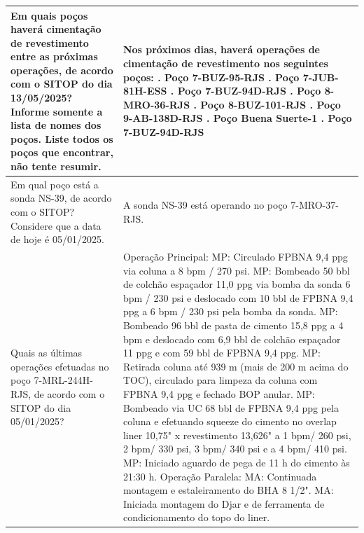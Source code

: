 \begin{landscape}
\begin{longtable}{|p{3cm}|p{22cm}|}
Em quais poços haverá cimentação de revestimento entre as próximas operações, de acordo com o SITOP do dia 13/05/2025? Informe somente a lista de nomes dos poços. Liste todos os poços que encontrar, não tente resumir. & Nos próximos dias, haverá operações de cimentação de revestimento nos seguintes poços:
        \newline        1. Poço 7-BUZ-95-RJS
        \newline        2. Poço 7-JUB-81H-ESS
        \newline        3. Poço 7-BUZ-94D-RJS
        \newline        4. Poço 8-MRO-36-RJS
        \newline        5. Poço 8-BUZ-101-RJS
        \newline        6. Poço 9-AB-138D-RJS
        \newline        7. Poço Buena Suerte-1
        \newline        8. Poço 7-BUZ-94D-RJS \\ \hline

Em qual poço está a sonda NS-39, de acordo com o SITOP? Considere que a data de hoje é 05/01/2025.  & A sonda NS-39 está operando no poço 7-MRO-37-RJS. \\ \hline

Quais as últimas operações efetuadas no poço 7-MRL-244H-RJS, de acordo com o SITOP do dia 05/01/2025? & Operação Principal:
        MP: Circulado FPBNA 9,4 ppg via coluna a 8 bpm / 270 psi.
        MP: Bombeado 50 bbl de colchão espaçador 11,0 ppg via bomba da sonda 6 bpm / 230 psi e deslocado com 10 bbl de FPBNA 9,4 ppg a 6 bpm / 230 psi pela bomba da sonda.
        MP: Bombeado 96 bbl de pasta de cimento 15,8 ppg a 4 bpm e deslocado com 6,9 bbl de colchão espaçador 11 ppg e com 59 bbl de FPBNA 9,4 ppg.
        MP: Retirada coluna até 939 m (mais de 200 m acima do TOC), circulado para limpeza da coluna com FPBNA 9,4 ppg e fechado BOP anular.
        MP: Bombeado via UC 68 bbl de FPBNA 9,4 ppg pela coluna e efetuando squeeze do cimento no overlap liner 10,75" x revestimento 13,626" a 1 bpm/ 260 psi, 2 bpm/ 330 psi, 3 bpm/ 340 psi e a 4 bpm/ 410 psi.  
        MP: Iniciado aguardo de pega de 11 h do cimento às 21:30 h.
        \newline        Operação Paralela:
        MA: Continuada montagem e estaleiramento do BHA 8 1/2". 
        MA: Iniciada montagem do Djar e de ferramenta de condicionamento do topo do liner.  \\ \hline


\end{longtable}
\end{landscape}
